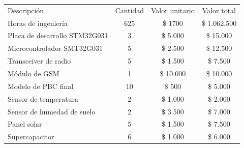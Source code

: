 \documentclass[
11pt, %
codirector, %
]{charter}
\begin{document}
\begin{table}[htpb]
\centering
\begin{tabularx}{\linewidth}{@{}|X|c|r|r|@{}}
\hline
\rowcolor[HTML]{C0C0C0} 
\multicolumn{4}{|c|}{\cellcolor[HTML]{C0C0C0}COSTOS DIRECTOS} \\ \hline
\rowcolor[HTML]{C0C0C0} 
Descripción &
  \multicolumn{1}{c|}{\cellcolor[HTML]{C0C0C0}Cantidad} &
  \multicolumn{1}{c|}{\cellcolor[HTML]{C0C0C0}Valor unitario} &
  \multicolumn{1}{c|}{\cellcolor[HTML]{C0C0C0}Valor total} \\ \hline

  Horas de ingeniería &
  \multicolumn{1}{c|}{625} &
  \multicolumn{1}{c|}{\$ 1700} &
  \multicolumn{1}{c|}{\$ 1.062.500} \\ \hline
  
Placa de desarrollo STM32G031 &
  \multicolumn{1}{c|}{3} &
  \multicolumn{1}{c|}{\$ 5.000} &
  \multicolumn{1}{c|}{\$ 15.000} \\ \hline
  
Microcontrolador SMT32G031 &
  \multicolumn{1}{c|}{5} &
  \multicolumn{1}{c|}{\$ 2.500} &
  \multicolumn{1}{c|}{\$ 12.500} \\ \hline
  
Transceiver de radio &
  \multicolumn{1}{c|}{5} &
  \multicolumn{1}{c|}{\$ 1.500} &
  \multicolumn{1}{c|}{\$ 7.500} \\ \hline
  
Módulo de GSM &
  \multicolumn{1}{c|}{1} &
  \multicolumn{1}{c|}{\$ 10.000} &
  \multicolumn{1}{c|}{\$ 10.000} \\ \hline
  
Modelo de PBC final &
  \multicolumn{1}{c|}{10} &
  \multicolumn{1}{c|}{\$ 500} &
  \multicolumn{1}{c|}{\$ 5.000} \\ \hline
  
Sensor de temperatura &
  \multicolumn{1}{c|}{2} &
  \multicolumn{1}{c|}{\$ 1.000} &
  \multicolumn{1}{c|}{\$ 2.000} \\ \hline
  
Sensor de humedad de suelo &
  \multicolumn{1}{c|}{2} &
  \multicolumn{1}{c|}{\$ 3.500} &
  \multicolumn{1}{c|}{\$ 7.000} \\ \hline
  
Panel solar &
  \multicolumn{1}{c|}{5} &
  \multicolumn{1}{c|}{\$ 1.500} &
  \multicolumn{1}{c|}{\$ 7.500} \\ \hline
  
Supercapacitor &
  \multicolumn{1}{c|}{6} &
  \multicolumn{1}{c|}{\$ 1.000} &
  \multicolumn{1}{c|}{\$ 6.000} \\ \hline
  

\end{tabularx}
\end{table}
\end{document}
